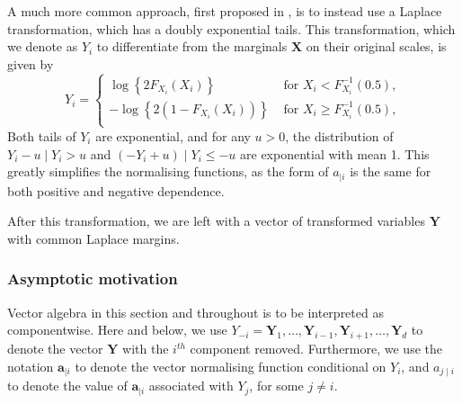 \documentclass{article}
\numberwithin{equation}{section}
\begin{document}
A much more common approach, first proposed in \cite{Keef2013}, is to instead use a Laplace transformation, which has a doubly exponential tails.
This transformation, which we denote as $Y_i$ to differentiate from the marginals $\bm{X}$ on their original scales, is given by 
\begin{equation} \label{eq:laplace}
  Y_i = \begin{cases}
    \log\left\{2F_{X_i}(X_i)\right\} &\text{ for } X_i < F_{X_i}^{-1}(0.5), \\
    -\log\left\{2(1 - F_{X_i}(X_i))\right\} &\text{ for } X_i \ge F_{X_i}^{-1}(0.5), \\
  \end{cases}
\end{equation}
Both tails of $Y_i$ are exponential, and for any $u > 0$, the distribution of $Y_i - u \mid Y_i > u$ and $(-Y_i + u) \mid Y_i \le -u$ are exponential with mean 1. 
This greatly simplifies the normalising functions, as the form of $a_{\mid i}$ is the same for both positive and negative dependence. 

After this transformation, we are left with a vector of transformed variables $\bm{Y}$ with common Laplace margins. 

\subsubsection{Asymptotic motivation}

Vector algebra in this section and throughout is to be interpreted as componentwise.
Here and below, we use $Y_{-i} = {\bm{Y}_1, \ldots, \bm{Y}_{i-1}, \bm{Y}_{i+1}, \ldots, \bm{Y}_d}$ to denote the vector $\bm{Y}$ with the $i^{th}$ component removed. 
Furthermore, we use the notation $\bm{a}_{\mid i}$ to denote the vector normalising function conditional on $Y_i$, and $a_{j \mid i}$ to denote the value of $\bm{a}_{\mid i}$ associated with $Y_j$, for some $j \ne i$. 
\end{document}
